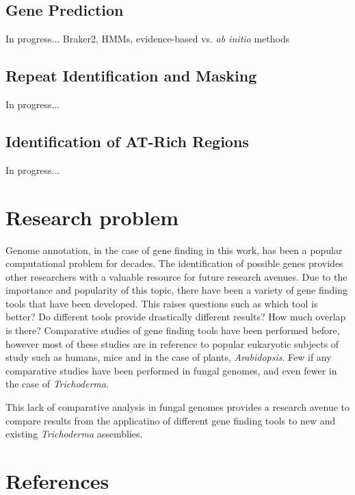 \documentclass[12pt]{article}
\begin{document}
\subsection{Gene Prediction}
In progress... Braker2, HMMs, evidence-based vs. \textit{ab initio}
methods

\subsection{Repeat Identification and Masking}
In progress...

\subsection{Identification of AT-Rich Regions}
In progress...

\section{Research problem}

Genome annotation, in the case of gene finding in this work, has been
a popular computational problem for decades. The identification of
possible genes provides other researchers with a valuable resource for
future research avenues. Due to the importance and popularity of this
topic, there have been a variety of gene finding tools that have been
developed. This raises questions such as which tool is better? Do
different tools provide drastically different results? How much
overlap is there? Comparative studies of gene finding tools have been
performed before, however most of these studies are in reference to
popular eukaryotic subjects of study such as humans, mice and in the
case of plants, \textit{Arabidopsis}. Few if any comparative studies
have been performed in fungal genomes, and even fewer in the case of
\textit{Trichoderma}.

This lack of comparative analysis in fungal genomes provides a
research avenue to compare results from the applicatino of different
gene finding tools to new and existing \textit{Trichoderma} assemblies.

\section{References}
\end{document}
